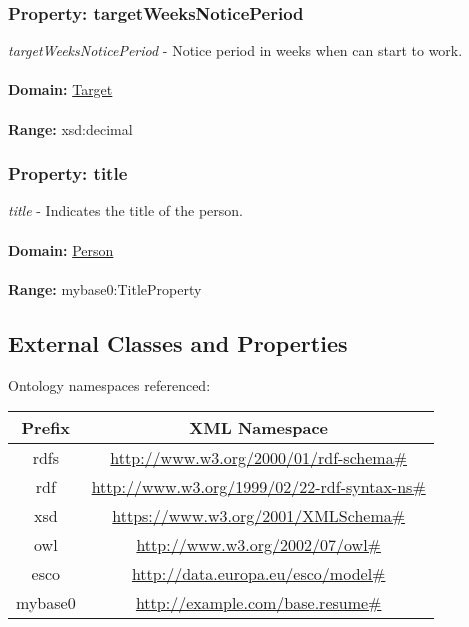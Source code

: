 \documentclass[a4paper,12pt]{article}
\numberwithin{equation}{section}
\begin{document}
\subsubsection{Property: targetWeeksNoticePeriod}\hypertarget{targetWeeksNoticePeriod}{}
\textit{targetWeeksNoticePeriod} - Notice period in weeks when can start to work.
\\\\
\textbf{Domain:} \hyperlink{Target}{Target} 
\\\\
\textbf{Range:}  xsd:decimal

\subsubsection{Property: title}\hypertarget{title}{}
\textit{title} - Indicates the title of the person.
\\\\
\textbf{Domain:} \hyperlink{Person}{Person} 
\\\\
\textbf{Range:}  mybase0:TitleProperty


\subsection{External Classes and Properties}
Ontology namespaces referenced:

\begin{tabular}{ | c | c  | } 
\hline
 \textbf{Prefix} & \textbf{XML Namespace}  \\ 
\hline
rdfs & \url{http://www.w3.org/2000/01/rdf-schema\#} \\ 
\hline
rdf & \url{http://www.w3.org/1999/02/22-rdf-syntax-ns\#}  \\ 
\hline
xsd & \url{https://www.w3.org/2001/XMLSchema\#}  \\ 
\hline
owl & \url{http://www.w3.org/2002/07/owl\#}  \\ 
\hline
esco & \url{http://data.europa.eu/esco/model\#}  \\ 
\hline
mybase0 & \url{http://example.com/base.resume\#}  \\ 
\hline
\end{tabular}
\end{document}
